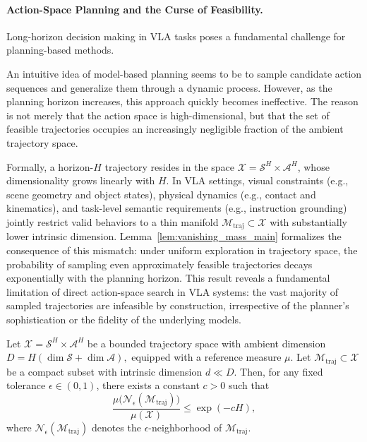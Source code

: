 
\label{sec:theory}
\paragraph{Action-Space Planning and the Curse of Feasibility.} 
Long-horizon decision making in VLA tasks
poses a fundamental challenge for planning-based methods.

An intuitive idea of model-based planning seems to be to sample candidate action sequences and generalize them through a dynamic process.
However, as the planning horizon increases,
this approach quickly becomes ineffective.
The reason is not merely that the action space is high-dimensional,
but that the set of feasible trajectories occupies
an increasingly negligible fraction of the ambient trajectory space.

Formally, a horizon-$H$ trajectory resides in the space
$\mathcal{X} = \mathcal{S}^H \times \mathcal{A}^H$,
whose dimensionality grows linearly with $H$.
In VLA settings, visual constraints (e.g., scene geometry and object states), physical dynamics (e.g., contact and kinematics), and task-level semantic requirements (e.g., instruction grounding) jointly restrict valid behaviors to a thin manifold
$\mathcal{M}_{\mathrm{traj}} \subset \mathcal{X}$
with substantially lower intrinsic dimension.
Lemma~\ref{lem:vanishing_mass_main} formalizes the consequence of this mismatch: under uniform exploration in trajectory space, the probability of sampling even approximately feasible trajectories decays exponentially with the planning horizon.
This result reveals a fundamental limitation of direct action-space search in VLA systems: the vast majority of sampled trajectories are infeasible by construction, irrespective of the planner’s sophistication or the fidelity of the underlying models.

\begin{lemma}
\label{lem:vanishing_mass_main}
Let $\mathcal{X} = \mathcal{S}^H \times \mathcal{A}^H$ be a bounded trajectory space
with ambient dimension
$
D = H(\dim \mathcal{S} + \dim \mathcal{A}),
$
equipped with a reference measure $\mu$.
Let $\mathcal{M}_{\mathrm{traj}} \subset \mathcal{X}$ be a compact subset
with intrinsic dimension $d \ll D$.
Then, for any fixed tolerance $\epsilon \in (0,1)$,
there exists a constant $c > 0$ such that
\begin{equation}

\frac{\mu\big(\mathcal{N}_\epsilon(\mathcal{M}_{\mathrm{traj}})\big)}{\mu(\mathcal{X})}
\le \exp(-cH),
\end{equation}
where $\mathcal{N}_\epsilon(\mathcal{M}_{\mathrm{traj}})$ denotes the $\epsilon$-neighborhood
of $\mathcal{M}_{\mathrm{traj}}$.
\end{lemma}

